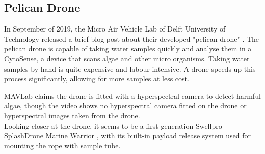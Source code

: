 \newpage
\subsection{Pelican Drone}
In September of 2019, the Micro Air Vehicle Lab of Delft University of Technology released a brief blog post about their developed "pelican drone" \cite{pelicandrone}. The pelican drone is capable of taking water samples quickly and analyse them in a CytoSense, a device that scans algae and other micro organisms. Taking water samples by hand is quite expensive and labour intensive. A drone speeds up this process significantly, allowing for more samples at less cost. 

MAVLab claims the drone is fitted with a hyperspectral camera to detect harmful algae, though the video \cite{pelicandronevideo} shows no hyperspectral camera fitted on the drone or hyperspectral images taken from the drone.\\

Looking closer at the drone, it seems to be a first generation Swellpro SplashDrone Marine Warrior \cite{marinewarrior}, with its built-in payload release system used for mounting the rope with sample tube.

